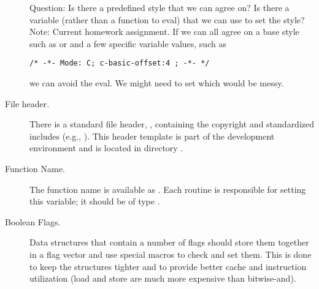 \documentclass{article}
\begin{document}
\begin{description}
Question: Is there a predefined style that we can agree on?  Is there a
variable (rather than a function to eval) that we can use to set the
style?
Note: Current homework assignment.  If we can all agree on a base
style such as  or  and a few specific variable
values, such as 
\begin{verbatim}
/* -*- Mode: C; c-basic-offset:4 ; -*- */
\end{verbatim}
we can avoid the eval.
We might need to set  which would be messy.


\item[File header.]
There is a standard file header, , containing the copyright and
standardized includes (e.g., ).  This header
template is part of the development environment and is located in directory
. 

\item[Function Name.]
The function name is available as .  Each routine is responsible
for setting this variable; it should be of type .




\item[Boolean Flags.]
Data structures that contain a number of flags should store them
together in a flag vector and use special macros to check and set
them.  This is done to keep the structures tighter and to provide better cache
and instruction utilization (load and store are much more expensive than
bitwise-and).  


\end{description}
\end{document}
